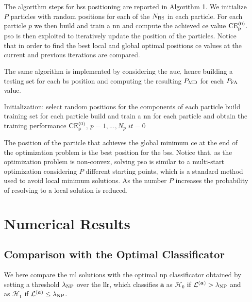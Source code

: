 \documentclass[twocolumns]{IEEEtran}
\begin{document}
The algorithm steps for \acp{bs} positioning are reported in Algorithm 1. We initialize $P$ particles with random positions for each of the $N_{\rm BS}$ in each particle. For each particle $p$ we then build and train a \ac{nn} and compute the achieved \ac{ce} value $\rm{CE}_p^{(0)}$. \ac{pso} is then exploited to iteratively update the position of the particles. Notice that in order to find the best local and global optimal positions \ac{ce} values at the current and previous iterations are compared. 

The same algorithm is implemented by considering the \ac{auc}, hence building a testing set for each \ac{bs} position and computing the resulting $P_{\rm MD}$ for each $P_{\rm FA}$ value.

 \begin{algorithm}[t]
   

  Initialization: select random positions for the components of each particle\;
                  build training set for each particle\;
                  build and train a \ac{nn} for each particle and obtain the training performance $\rm{CE}_p^{(0)}$, $p=1,...,N_p$\;
                  $it = 0$\;

    
\caption{BSs positioning algorithm}
 \end{algorithm}

The position of the particle that achieves the global minimum \ac{ce} at the end of the optimization problem is the best position for the \acp{bs}. Notice that, as the optimization problem is non-convex, solving \ac{pso} is similar to a multi-start optimization considering $P$ different starting points, which is a standard method used to avoid local minimum solutions. As the number $P$ increases the probability of resolving to a local solution is reduced.

\section{Numerical Results}
\subsection{Comparison with the Optimal Classificator}
We here compare the \ac{ml} solutions with the optimal \ac{np} classificator obtained by setting a threshold $\lambda_{\rm NP}$ over the \ac{llr}, which classifies $\bm{a}$ as $\mathcal{H}_0$ if $\mathcal{L}^{(\bm{a})} > \lambda_{\rm NP}$ and as $\mathcal{H}_1$ if $\mathcal{L}^{(\bm{a})} \le \lambda_{\rm NP}$.
\end{document}

